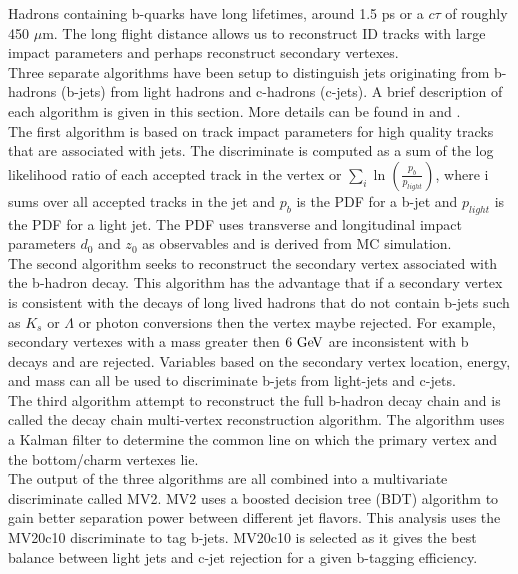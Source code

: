 \indent Hadrons containing b-quarks have long lifetimes, around 1.5 ps or a $c\tau$ of roughly 450 $\mu$m.  The long flight distance allows us to reconstruct ID tracks with large impact parameters and perhaps reconstruct secondary vertexes. \\%

\indent Three separate algorithms have been setup to distinguish jets originating from b-hadrons (b-jets) from light hadrons and c-hadrons (c-jets).  A brief description of each algorithm is given in this section.  More details can be found in \cite{btagging2016}  and \cite{btagging2015}.  \\

\indent The first algorithm is based on track impact parameters for high quality tracks that are associated with jets.  The discriminate is computed as a sum of the log likelihood ratio of each accepted track in the vertex or $\sum_i \ln(\frac{p_b}{p_{light}})$, where i sums over all accepted tracks in the jet and $p_b$ is the PDF for a b-jet and $p_{light}$ is the PDF for a light jet.  The PDF uses transverse and longitudinal impact parameters $d_0$ and $z_0$ as observables and is derived from MC simulation.  \\

\indent The second algorithm seeks to reconstruct the secondary vertex associated with the b-hadron decay.  This algorithm has the advantage that if a secondary vertex is consistent with the decays of long lived hadrons that do not contain b-jets such as $K_s$ or $\Lambda$ or photon conversions then the vertex maybe rejected.  For example, secondary vertexes with a mass greater then $6 \gev$ are inconsistent with b decays and are rejected. Variables based on the secondary vertex location, energy, and mass can all be used to discriminate b-jets from light-jets and c-jets.  \\

\indent The third algorithm attempt to reconstruct the full b-hadron decay chain and is called the decay chain multi-vertex reconstruction algorithm.  The algorithm uses a Kalman filter to determine the common line on which the primary vertex and the bottom/charm vertexes lie.  \\

\indent The output of the three algorithms are all combined into a multivariate discriminate called MV2.  MV2 uses a boosted decision tree (BDT) algorithm \cite{TMVA} to gain better separation power between different jet flavors. This analysis uses the MV20c10 discriminate to tag b-jets. MV20c10 is selected as it gives the best balance between light jets and c-jet rejection for a given b-tagging efficiency.  \\

